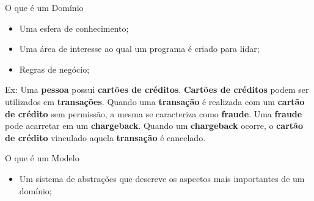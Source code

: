 \documentclass[aspectratio=169]{beamer}
\begin{document}
\begin{frame}{O que é um Domínio}	
	\begin{itemize}	
		\item Uma esfera de conhecimento;
		\item Uma área de interesse ao qual um programa é criado para lidar;
		\item Regras de negócio;
	\end{itemize}

	Ex: Uma \textbf{pessoa} possui \textbf{cartões de créditos}. \textbf{Cartões de créditos} podem ser utilizados em \textbf{transações}. Quando uma \textbf{transação} é realizada com um \textbf{cartão de crédito} sem permissão, a mesma se caracteriza como \textbf{fraude}. Uma \textbf{fraude} pode acarretar em um \textbf{chargeback}. Quando um \textbf{chargeback} ocorre, o \textbf{cartão de crédito} vinculado aquela \textbf{transação} é cancelado.
\end{frame}

\begin{frame}{O que é um Modelo}
	\begin{itemize}	
		\item Um sistema de abstrações que descreve os aspectos mais importantes de um domínio;
	\end{itemize}
\end{frame}
\end{document}
